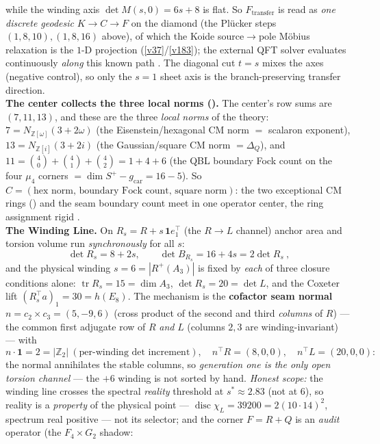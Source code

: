 \documentclass[11pt,a4paper]{article}
\newcommand{\gcar}{g_{\mathrm{car}}}
\newcommand{\Z}{\mathbb{Z}}
\theoremstyle{definition}
\begin{document}
\begin{winbox}
while the winding axis $\det M(s,0)=6s{+}8$ is flat. So $F_{\mathrm{transfer}}$ is read as \emph{one discrete
geodesic} $K\to C\to F$ on the diamond (the Pl\"ucker steps $(1,8,10),(1,8,16)$ above), of which the Koide
source$\to$pole M\"obius relaxation is the $1$-D projection (\vref{v37}/\vref{v183}); the external QFT solver
evaluates continuously \emph{along} this known path \mC. The diagonal cut $t{=}s$ mixes the axes (negative
control), so only the $s{=}1$ sheet axis is the branch-preserving transfer direction.
\smallskip\\
\noindent\textbf{The center collects the three local norms ().} The
center's row sums are $(7,11,13)$, and these are the three \emph{local norms} of the theory:
$7=N_{\mathbb Z[\omega]}(3{+}2\omega)$ (the Eisenstein/hexagonal CM norm $=$ scalaron exponent),
$13=N_{\mathbb Z[i]}(3{+}2i)$ (the Gaussian/square CM norm $=\Delta_Q$), and
$11=\binom40{+}\binom41{+}\binom42=1{+}4{+}6$ (the QBL boundary Fock count on the four $\mu_4$ corners
$=\dim S^+{-}\gcar=16{-}5$). So $C=(\text{hex norm},\,\text{boundary Fock count},\,\text{square norm})$: the
two exceptional CM rings () and the seam boundary count meet in one operator
center, the ring assignment rigid \mE.
\smallskip\\
\noindent\textbf{The Winding Line.} On $R_s=R+s\,\mathbf 1e_1^\top$ (the $R\to L$ channel) anchor area and
torsion volume run \emph{synchronously} for all $s$:
\[
  \boxed{\ \det R_s=8+2s,\qquad \det B_{R_s}=16+4s=2\det R_s\ },
\]
and the physical winding $s=6=|R^+(A_3)|$ is fixed by \emph{each} of three closure conditions alone:
$\operatorname{tr}R_s=15=\dim A_3$, $\det R_s=20=\det L$, and the Coxeter lift $(R_s^\top a)_1=30=h(E_8)$.
The mechanism is the \textbf{cofactor seam normal} $n=c_2{\times}c_3=(5,-9,6)$ (cross product of the
second and third \emph{columns} of $R$) --- the common first adjugate row of $R$ \emph{and} $L$ (columns
$2,3$ are winding-invariant) --- with
\[
  n\cdot\mathbf 1=2=|\Z_2|\ (\text{per-winding det increment}),\quad
  n^\top R=(8,0,0),\quad n^\top L=(20,0,0):
\]
the normal annihilates the stable columns, so \emph{generation one is the only open torsion channel} ---
the $+6$ winding is not sorted by hand. \emph{Honest scope:} the winding line crosses the spectral
\emph{reality} threshold at $s^*\!\approx\!2.83$ (not at $6$), so reality is a \emph{property} of the
physical point --- $\operatorname{disc}\chi_L=39200=2(10\cdot14)^2$, spectrum real positive --- not its
selector; and the corner $F=R{+}Q$ is an \emph{audit} operator (the $F_4{\times}G_2$ shadow:

\end{winbox}
\end{document}
